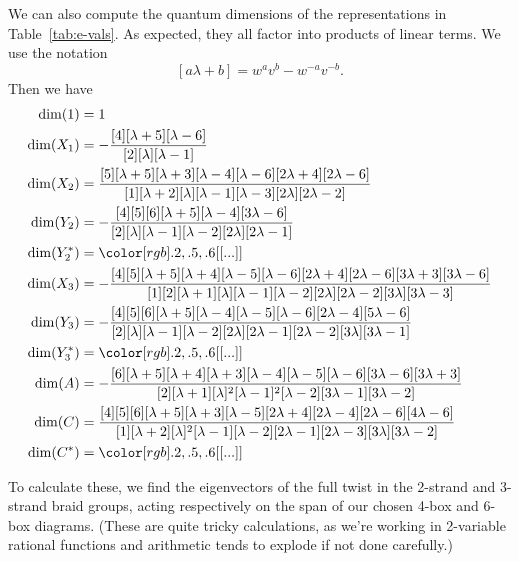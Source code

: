 \documentclass[12pt]{amsart}
\begin{document}
We can also compute the quantum dimensions of the representations in
Table~\ref{tab:e-vals}. As expected, they all factor into products of
linear terms. We use the notation
\[
[a\lambda + b] = w^av^b - w^{-a}v^{-b}.
\]
Then we have
\begin{align*}
  \dim(1) &= 1 \\
  \dim(X_1) &= -\frac{[4][\lambda+5][\lambda-6]}{[2][\lambda][\lambda-1]}\\
  \dim(X_2) &= \frac{[5][\lambda+5][\lambda+3][\lambda-4][\lambda-6][2\lambda+4][2\lambda-6]}
                  {[1][\lambda+2][\lambda][\lambda-1][\lambda-3][2\lambda][2\lambda-2]}\\
  \dim(Y_2) &= -\frac{[4][5][6][\lambda+5][\lambda-4][3\lambda-6]}
                 {[2][\lambda][\lambda-1][\lambda-2][2\lambda][2\lambda-1]}\\
  \dim(Y_2^*) &= \nn{...} \\
  \dim(X_3) &= - \frac{[4][5][\lambda+5][\lambda+4][\lambda-5][\lambda-6][2\lambda+4][2\lambda-6][3\lambda+3][3\lambda-6]}
                 {[1][2][\lambda+1][\lambda][\lambda-1][\lambda-2][2\lambda][2\lambda-2][3\lambda][3\lambda-3]}\\
  \dim(Y_3) &= - \frac{[4][5][6][\lambda+5][\lambda-4][\lambda-5][\lambda-6][2\lambda-4][5\lambda-6]}
                     {[2][\lambda][\lambda-1][\lambda-2][2\lambda][2\lambda-1][2\lambda-2][3\lambda][3\lambda-1]}\\
  \dim(Y_3^*) &= \nn{...} \\
  \dim(A)   &= - \frac{[6][\lambda+5][\lambda+4][\lambda+3][\lambda-4][\lambda-5][\lambda-6][3\lambda-6][3\lambda+3]}
                     {[2][\lambda+1][\lambda]^2[\lambda-1]^2[\lambda-2][3\lambda-1][3\lambda-2]}\\
  \dim(C)   &= \frac{[4][5][6][\lambda+5][\lambda+3][\lambda-5][2\lambda+4][2\lambda-4][2\lambda-6][4\lambda-6]}
                     {[1][\lambda+2][\lambda]^2[\lambda-1][\lambda-2][2\lambda-1][2\lambda-3][3\lambda][3\lambda-2]} \\
  \dim(C^*) &= \nn{...}
\end{align*}

To calculate these, we find the eigenvectors of the full twist in the 2-strand and 3-strand braid groups, acting respectively on the span of our chosen 4-box and 6-box diagrams. (These are quite tricky calculations, as we're working in 2-variable rational functions and arithmetic tends to explode if not done carefully.)
\end{document}
